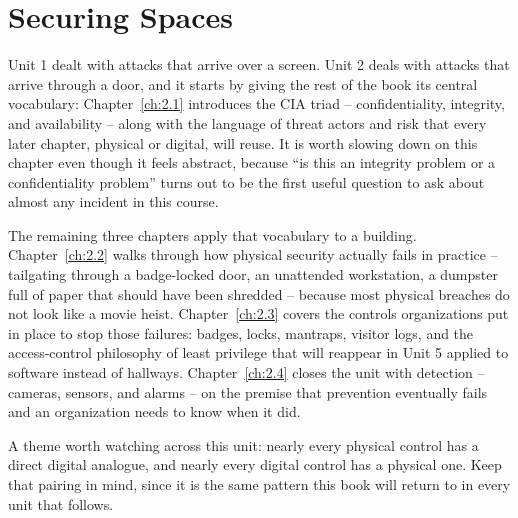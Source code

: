 \part{Securing Spaces}

Unit 1 dealt with attacks that arrive over a screen. Unit 2 deals with attacks that arrive through
a door, and it starts by giving the rest of the book its central vocabulary:
Chapter~\ref{ch:2.1} introduces the CIA triad -- confidentiality, integrity, and availability --
along with the language of threat actors and risk that every later chapter, physical or digital,
will reuse. It is worth slowing down on this chapter even though it feels abstract, because ``is
this an integrity problem or a confidentiality problem'' turns out to be the first useful question
to ask about almost any incident in this course.

The remaining three chapters apply that vocabulary to a building. Chapter~\ref{ch:2.2} walks
through how physical security actually fails in practice -- tailgating through a badge-locked
door, an unattended workstation, a dumpster full of paper that should have been shredded --
because most physical breaches do not look like a movie heist. Chapter~\ref{ch:2.3} covers the
controls organizations put in place to stop those failures: badges, locks, mantraps, visitor logs,
and the access-control philosophy of least privilege that will reappear in Unit 5 applied to
software instead of hallways. Chapter~\ref{ch:2.4} closes the unit with detection -- cameras,
sensors, and alarms -- on the premise that prevention eventually fails and an organization needs
to know when it did.

A theme worth watching across this unit: nearly every physical control has a direct digital
analogue, and nearly every digital control has a physical one. Keep that pairing in mind, since
it is the same pattern this book will return to in every unit that follows.
